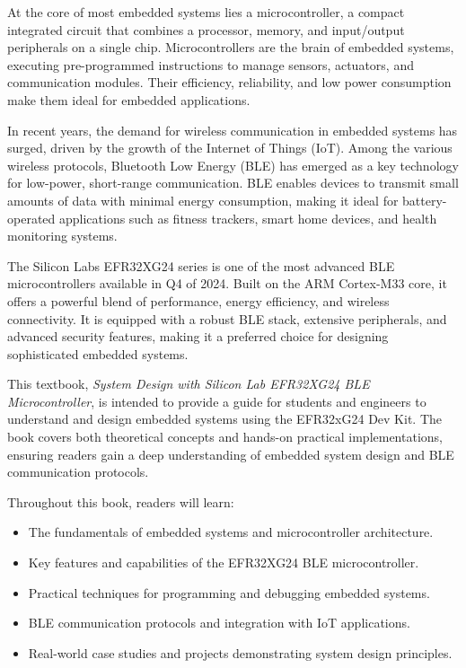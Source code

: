 \documentclass[
  9pt,
  letterpaper,
  abstract,
  titlepage]{scrbook}
\begin{document}
At the core of most embedded systems lies a microcontroller, a compact
integrated circuit that combines a processor, memory, and input/output
peripherals on a single chip. Microcontrollers are the brain of embedded
systems, executing pre-programmed instructions to manage sensors,
actuators, and communication modules. Their efficiency, reliability, and
low power consumption make them ideal for embedded applications.

In recent years, the demand for wireless communication in embedded
systems has surged, driven by the growth of the Internet of Things
(IoT). Among the various wireless protocols, Bluetooth Low Energy (BLE)
has emerged as a key technology for low-power, short-range
communication. BLE enables devices to transmit small amounts of data
with minimal energy consumption, making it ideal for battery-operated
applications such as fitness trackers, smart home devices, and health
monitoring systems.

The Silicon Labs EFR32XG24 series is one of the most advanced BLE
microcontrollers available in Q4 of 2024. Built on the ARM Cortex-M33
core, it offers a powerful blend of performance, energy efficiency, and
wireless connectivity. It is equipped with a robust BLE stack, extensive
peripherals, and advanced security features, making it a preferred
choice for designing sophisticated embedded systems.

This textbook, \emph{System Design with Silicon Lab EFR32XG24 BLE
Microcontroller}, is intended to provide a guide for students and
engineers to understand and design embedded systems using the EFR32xG24
Dev Kit. The book covers both theoretical concepts and hands-on
practical implementations, ensuring readers gain a deep understanding of
embedded system design and BLE communication protocols.

Throughout this book, readers will learn:

\begin{itemize}
\item
  The fundamentals of embedded systems and microcontroller architecture.
\item
  Key features and capabilities of the EFR32XG24 BLE microcontroller.
\item
  Practical techniques for programming and debugging embedded systems.
\item
  BLE communication protocols and integration with IoT applications.
\item
  Real-world case studies and projects demonstrating system design
  principles.
\end{itemize}
\end{document}
